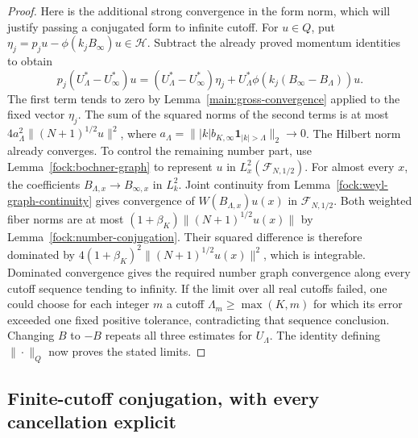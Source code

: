 \documentclass[11pt,a4paper]{article}
\theoremstyle{definition}
\theoremstyle{remark}
\begin{document}
\begin{proof}
Here is the additional strong convergence in the form norm, which
will justify passing a conjugated form to infinite cutoff.
For $u\in Q$, put $\eta_j=p_ju-\phi(k_jB_\infty)u\in\mathcal H$.
Subtract the already proved momentum identities to obtain
\[
 p_j(U_\Lambda^*-U_\infty^*)u
 =(U_\Lambda^*-U_\infty^*)\eta_j
   +U_\Lambda^*\phi(k_j(B_\infty-B_\Lambda))u.
\]
The first term tends to zero by Lemma~\ref{main:gross-convergence}
applied to the fixed vector $\eta_j$. The sum of the squared norms
of the second terms is at most
$4a_\Lambda^2\|(N+1)^{1/2}u\|^2$, where
$a_\Lambda=\||k|b_{K,\infty}\mathbf1_{|k|>\Lambda}\|_2\to0$.
The Hilbert norm already converges. To control the remaining number
part, use Lemma~\ref{fock:bochner-graph} to represent $u$ in
$L^2_x(\mathcal F_{N,1/2})$. For almost every $x$, the coefficients
$B_{\Lambda,x}\to B_{\infty,x}$ in $L^2_k$. Joint continuity
from Lemma~\ref{fock:weyl-graph-continuity} gives convergence of
$W(B_{\Lambda,x})u(x)$ in $\mathcal F_{N,1/2}$. Both weighted
fiber norms are at most
$(1+\beta_K)\|(N+1)^{1/2}u(x)\|$ by
Lemma~\ref{fock:number-conjugation}. Their squared difference is
therefore dominated by
$4(1+\beta_K)^2\|(N+1)^{1/2}u(x)\|^2$, which is integrable.
Dominated convergence gives the required number graph convergence
along every cutoff sequence tending to infinity. If the limit over
all real cutoffs failed, one could choose for each integer $m$ a
cutoff $\Lambda_m\geq\max(K,m)$ for which its error exceeded one
fixed positive tolerance, contradicting that sequence conclusion.
Changing $B$ to $-B$ repeats all three estimates for $U_\Lambda$.
The identity defining $\|\cdot\|_Q$ now proves the stated limits.
\end{proof}


\subsection{Finite-cutoff conjugation, with every cancellation explicit}
\end{document}
